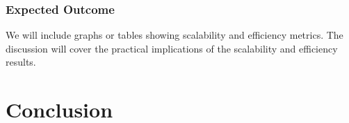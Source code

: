 \documentclass{article}
\begin{document}
\subsubsection{Expected Outcome}
We will include graphs or tables showing scalability and efficiency metrics. The discussion will cover the practical implications of the scalability and efficiency results.







\section{Conclusion}
\end{document}
